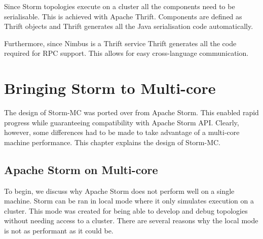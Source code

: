 \documentclass[bsc,logo,frontabs,twoside,singlespacing,normalheadings,parskip]{infthesis}     %
\begin{document}
Since Storm topologies execute on a cluster all the components need to be serialisable. This is achieved with Apache Thrift. Components are defined as Thrift objects and Thrift generates all the Java serialisation code automatically.

Furthermore, since Nimbus is a Thrift service Thrift generates all the code required for RPC support. This allows for easy cross-language communication.




\chapter{Bringing Storm to Multi-core}



The design of Storm-MC was ported over from Apache Storm. This enabled rapid progress while guaranteeing compatibility with Apache Storm API. Clearly, however, some differences had to be made to take advantage of a multi-core machine performance. This chapter explains the design of Storm-MC.

\section{Apache Storm on Multi-core}

To begin, we discuss why Apache Storm does not perform well on a single machine. Storm can be ran in local mode where it only simulates execution on a cluster. This mode was created for being able to develop and debug topologies without needing access to a cluster. There are several reasons why the local mode is not as performant as it could be.
\end{document}
